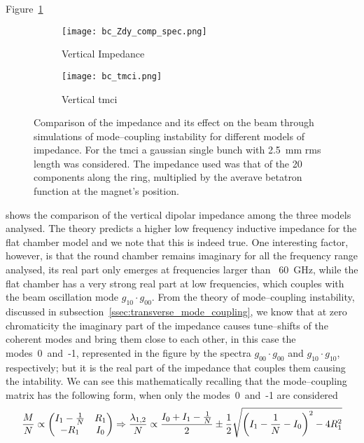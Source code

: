     Figure~\ref{fig:bc_zdy_comp}
    \begin{figure}
        \centering
        \begin{subfigure}[c]{0.48\textwidth}
            \centering
            \texttt{[image: bc\_Zdy\_comp\_spec.png]}
            \caption{Vertical Impedance}
            \label{fig:bc_zdy_comp}
        \end{subfigure}\hfill
        \begin{subfigure}[c]{0.48\textwidth}
            \centering
            \texttt{[image: bc\_tmci.png]}
            \caption{Vertical \gls{tmci}}
            \label{fig:bc_tmci}
        \end{subfigure}
        \caption[Comparison of the vertical dipolar impedance among different models of BC chamber.]{Comparison of the impedance and its effect on the beam through simulations of mode--coupling instability for different models of impedance. For the \gls{tmci} a gaussian single bunch with \SI{2.5}{\milli\meter} \gls{rms} length was considered. The impedance used was that of the 20 components along the ring, multiplied by the averave betatron function at the magnet's position.}
        \label{fig:bc_comparisons}
    \end{figure}
     shows the comparison of the vertical dipolar impedance among the three models analysed. The theory predicts a higher low frequency inductive impedance for the flat chamber model and we note that this is indeed true. One interesting factor, however, is that the round chamber remains imaginary for all the frequency range analysed, its real part only emerges at frequencies larger than ~\SI{60}{\giga\hertz}, while the flat chamber has a very strong real part at low frequencies, which couples with the beam oscillation mode $g_{10}\cdot g_{00}$. From the theory of mode--coupling instability, discussed in subsection~\ref{ssec:transverse_mode_coupling}, we know that at zero chromaticity the imaginary part of the impedance causes tune--shifts of the coherent modes and bring them close to each other, in this case the modes~0~and~-1, represented in the figure by the spectra $g_{00}\cdot g_{00}$ and $g_{10}\cdot g_{10}$, respectively; but it is the real part of the impedance that couples them causing the intability. We can see this mathematically recalling that the mode--coupling matrix has the following form, when only the modes~0~and~-1 are considered
     \begin{align}\label{eq:bc_eigen_value}
         \frac{M}{N} \propto
         \begin{pmatrix} I_1 -\frac1N & R_1 \\ -R_1 & I_0 \end{pmatrix}
         \Rightarrow
         \frac{\lambda_{1,2}}{N} \propto \frac{I_0 + I_1 -\frac1N}{2} \pm \frac12\sqrt{\left(I_1-\frac1N - I_0\right)^2 - 4R_1^2}
     \end{align}
